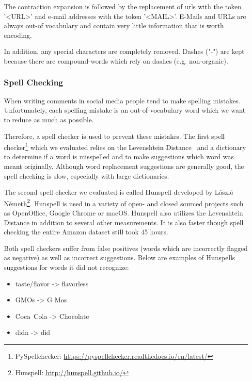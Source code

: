 The contraction expansion is followed by the replacement of \glspl{url} with the token '<URL>' and e-mail addresses with the token '<MAIL>'. E-Mails and URLs are always out-of vocabulary and contain very little information that is worth encoding. 
\medskip

In addition, any special characters are completely removed. Dashes ("-") are kept because there are compound-words which rely on dashes (e.g. non-organic).

\subsubsection*{Spell Checking}
\label{sec:05_SpellChecking}
When writing comments in social media people tend to make spelling mistakes. Unfortunately, each spelling mistake is an out-of-vocabulary word which we want to reduce as much as possible.

Therefore, a spell checker is used to prevent these mistakes. The first spell checker\footnote{PySpellchecker: \url{https://pyspellchecker.readthedocs.io/en/latest/}} which we evaluated relies on the Levenshtein Distance~\cite{Levenshtein1966} and a dictionary to determine if a word is misspelled and to make suggestions which word was meant originally. Although word replacement suggestions are generally good, the spell checking is slow, especially with large dictionaries.
\medskip

The second spell checker we evaluated is called Hunspell developed by László Németh\footnote{Hunspell: \hyperlink{http://hunspell.github.io/}{http://hunspell.github.io/}}. Hunspell is used in a variety of open- and closed sourced projects such as OpenOffice, Google Chrome or macOS. Hunspell also utilizes the Levenshtein Distance in addition to several other measurements. It is also faster though spell checking the entire Amazon dataset still took 45 hours. 
\medskip

Both spell checkers suffer from false positives {(words which are incorrectly flagged as negative)} as well as incorrect suggestions. Below are examples of Hunspells suggestions for words it did not recognize:

\begin{itemize}
    \item taste/flavor -> flavorless
    \item GMOs -> G Mos
    \item Coca~Cola -> Chocolate
    \item didn -> did
\end{itemize}

